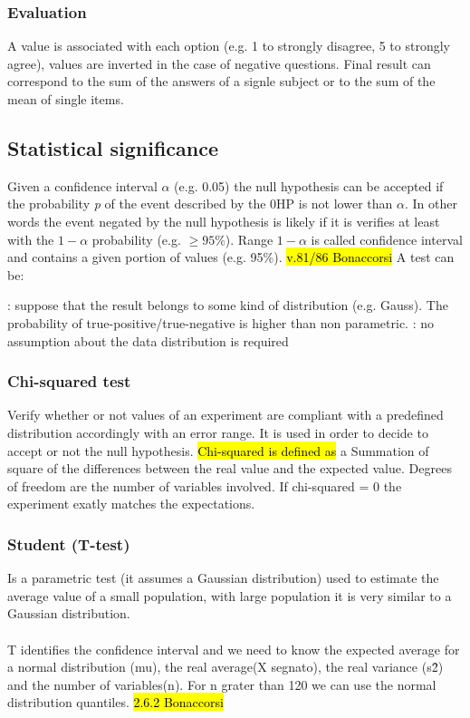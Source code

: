 	\subsubsection{Evaluation}
	A value is associated with each option (e.g. 1 to strongly disagree, 5 to strongly agree), values are inverted in the case of negative questions. Final result can correspond to the sum of the answers of a signle subject or to the sum of the mean of single items. 
	
	\subsection{Statistical significance}
	Given a confidence interval $\alpha$ (e.g. 0.05) the null hypothesis can be accepted if the probability \textit{p} of the event described by the 0HP is not lower than $\alpha$. In other words the event negated by the null hypothesis is likely if it is verifies at least with the $ 1-\alpha $ probability (e.g. $\geq95\%$).
	Range $ 1-\alpha $ is called confidence interval and contains a given portion of values (e.g. 95\%). %
	\hl{v.81/86 Bonaccorsi}
	A test can be:
	\begin{itemize}
		: suppose that the result belongs to some kind of distribution (e.g. Gauss). The probability of true-positive/true-negative is higher than non parametric.
		: no assumption about the data distribution is required
	\end{itemize}

	\subsubsection{Chi-squared test}
	Verify whether or not values of an experiment are compliant with a predefined distribution accordingly with an error range. It is used in order to decide to accept or not the null hypothesis. \hl{Chi-squared is defined as} a Summation of square of the differences between the real value and the expected value. Degrees of freedom are the number of variables involved. If chi-squared = 0 the experiment exatly matches the expectations.
	
	\subsubsection{Student (T-test)}
	Is a parametric test (it assumes a Gaussian distribution) used to estimate the average value of a small population, with large population it is very similar to a Gaussian distribution. 
	\\\\
	T identifies the confidence interval and we need to know the expected average for a normal distribution (mu), the real average(X segnato), the real variance (s\^2) and the number of variables(n). For n grater than 120 we can use the normal distribution quantiles.
	\hl{2.6.2 Bonaccorsi}
	
